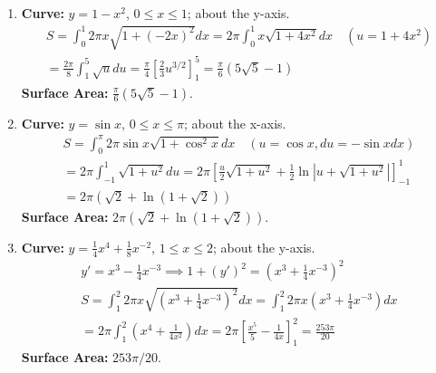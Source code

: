 \documentclass[12pt]{article}
\begin{document}
\begin{enumerate}
    \item \textbf{Curve:} $y=1-x^2$, $0 \le x \le 1$; about the y-axis.
    \begin{align*}
        S = \int_0^1 2\pi x \sqrt{1+(-2x)^2} dx = 2\pi \int_0^1 x\sqrt{1+4x^2}dx \quad (u=1+4x^2) \\
        = \frac{2\pi}{8}\int_1^5 \sqrt{u}du = \frac{\pi}{4}[\frac{2}{3}u^{3/2}]_1^5 = \frac{\pi}{6}(5\sqrt{5}-1)
    \end{align*}
    \textbf{Surface Area:} $\frac{\pi}{6}(5\sqrt{5}-1)$.

    \item \textbf{Curve:} $y=\sin x$, $0 \le x \le \pi$; about the x-axis.
    \begin{align*}
        S = \int_0^\pi 2\pi \sin x \sqrt{1+\cos^2 x} dx \quad (u=\cos x, du=-\sin x dx) \\
        = 2\pi\int_{-1}^1 \sqrt{1+u^2}du = 2\pi[\frac{u}{2}\sqrt{1+u^2}+\frac{1}{2}\ln|u+\sqrt{1+u^2}|]_{-1}^1 \\
        = 2\pi(\sqrt{2}+\ln(1+\sqrt{2}))
    \end{align*}
    \textbf{Surface Area:} $2\pi(\sqrt{2}+\ln(1+\sqrt{2}))$.

    \item \textbf{Curve:} $y = \frac{1}{4}x^4 + \frac{1}{8}x^{-2}$, $1 \le x \le 2$; about the y-axis.
    \begin{align*}
        y' = x^3 - \frac{1}{4}x^{-3} \implies 1+(y')^2 = (x^3+\frac{1}{4}x^{-3})^2 \\
        S = \int_1^2 2\pi x \sqrt{(x^3+\frac{1}{4}x^{-3})^2} dx = \int_1^2 2\pi x(x^3+\frac{1}{4}x^{-3}) dx \\
        = 2\pi \int_1^2 (x^4 + \frac{1}{4x^2})dx = 2\pi [\frac{x^5}{5}-\frac{1}{4x}]_1^2 = \frac{253\pi}{20}
    \end{align*}
    \textbf{Surface Area:} $253\pi/20$.
\end{enumerate}
\end{document}
